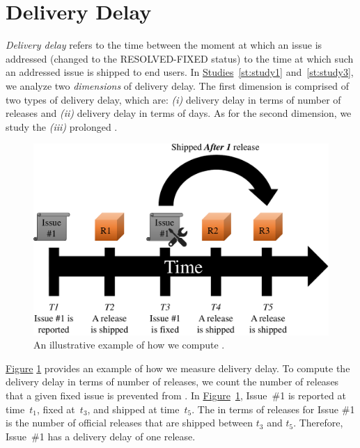\section{Delivery Delay}\label{ch2:deliverydelay}

{\em Delivery delay} refers to the time between the moment at which an issue is
addressed (\ie changed to the RESOLVED-FIXED status) to the time at which such
an addressed issue is shipped to end users. In 
\DIFdelbegin {}\DIFdelend \hyperref[st:study1]{Studies}~\ref{st:study1} and~\ref{st:study3}\DIFdelbegin \DIFdel{)}\DIFdelend , we analyze
two {\em dimensions} of delivery delay. The first dimension is comprised of two
types of delivery delay, which are: {\em (i)} delivery delay in terms of number
of releases and {\em (ii)} delivery delay in terms of days. As for the second
dimension, we study the {\em (iii)} prolonged \DIFdelbegin {}\DIFdelend \DIFaddbegin {}\DIFaddend .

\begin{figure}
	\centering
	\includegraphics[width=.80\textwidth,keepaspectratio]
	{chapters/chapter2/figures/integration_delay_releases.pdf}
	\caption{An illustrative example of how we compute \DIFdelbeginFL {}\DIFdelendFL \DIFaddbeginFL {}\DIFaddendFL .}
	\label{fig:integration_delay_releases}
\end{figure}

\hyperref[fig:integration_delay_releases]{Figure}
\ref{fig:integration_delay_releases} provides an example of how we measure
delivery delay. To compute the delivery delay in terms of number of releases, we
count the number of releases that a given fixed issue is prevented from
\DIFdelbegin {}\DIFdelend \DIFaddbegin {}\DIFaddend . In
\hyperref[fig:integration_delay_releases]{Figure}~\ref{fig:integration_delay_releases},
Issue~\#1 is reported at time~{\em $t_1$}, fixed at~{\em $t_3$}, and shipped at
time~{\em $t_5$}. The \DIFdelbegin {}\DIFdelend \DIFaddbegin {}\DIFaddend in terms of releases for Issue \#1 is the
number of official releases that are shipped between {\em $t_3$} and {\em
$t_5$}. Therefore, Issue~\#1 has a delivery delay of one release. 

